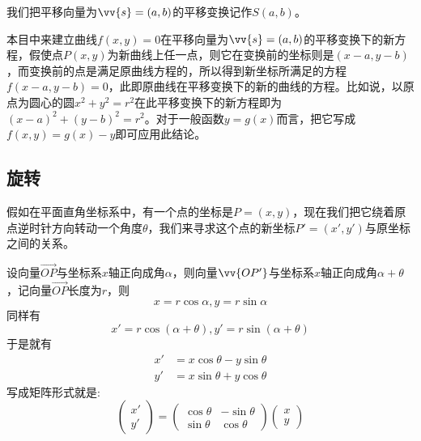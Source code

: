 我们把平移向量为$\vv{s}=(a,b)$的平移变换记作$S(a,b)$。

\begin{example}
  本目中来建立曲线$f(x,y)=0$在平移向量为$\vv{s}=(a,b)$的平移变换下的新方程，假使点$P(x,y)$为新曲线上任一点，则它在变换前的坐标则是$(x-a,y-b)$，而变换前的点是满足原曲线方程的，所以得到新坐标所满足的方程$f(x-a,y-b)=0$，此即原曲线在平移变换下的新的曲线的方程。比如说，以原点为圆心的圆$x^2+y^2=r^2$在此平移变换下的新方程即为$(x-a)^2+(y-b)^2=r^2$。对于一般函数$y=g(x)$而言，把它写成$f(x,y)=g(x)-y$即可应用此结论。
\end{example}

\subsection{旋转}
假如在平面直角坐标系中，有一个点的坐标是$P=(x,y)$，现在我们把它绕着原点逆时针方向转动一个角度$\theta$，我们来寻求这个点的新坐标$P'=(x', y')$与原坐标之间的关系。

设向量$\overrightarrow{OP}$与坐标系$x$轴正向成角$\alpha$，则向量$\vv{OP'}$与坐标系$x$轴正向成角$\alpha+\theta$，记向量$\overrightarrow{OP}$长度为$r$，则
\begin{equation*}
  x=r\cos{\alpha},y=r\sin{\alpha}
\end{equation*}
同样有
\begin{equation*}
  x'=r\cos{(\alpha+\theta)},y'=r\sin{(\alpha+\theta)}
\end{equation*}
于是就有
\begin{equation}
  \label{eq:formulas-rotation-axias}
  \begin{split}
  x' & = x\cos{\theta} - y\sin{\theta} \\
  y' & = x\sin{\theta} + y\cos{\theta}
  \end{split}
\end{equation}
写成矩阵形式就是:
\begin{equation*}
  \left(
    \begin{array}{c}
      x' \\
      y'
    \end{array}
  \right)
    =
    \left(
      \begin{array}{cc}
        \cos{\theta} & -\sin{\theta} \\
        \sin{\theta} & \cos{\theta}
      \end{array}
    \right)
  \left(
    \begin{array}{c}
      x \\
      y
    \end{array}
  \right)
\end{equation*}

